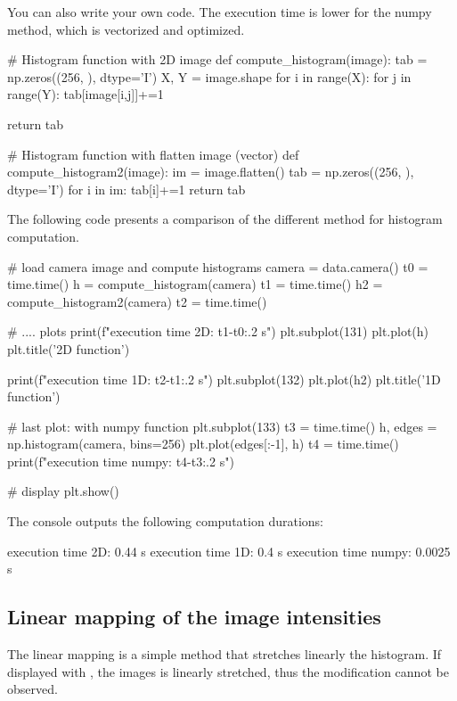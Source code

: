 You can also write your own code. The execution time is lower for the numpy method, which is vectorized and optimized.
\begin{python}
# Histogram function with 2D image
def compute_histogram(image):
    tab = np.zeros((256, ), dtype='I')
    X, Y = image.shape
    for i in range(X):
        for j in range(Y):
            tab[image[i,j]]+=1

    return tab
\end{python}
    
\begin{python}
# Histogram function with flatten image (vector)
def compute_histogram2(image):
    im = image.flatten() 
    tab = np.zeros((256, ), dtype='I')
    for i in im:
        tab[i]+=1
    return tab
\end{python}

The following code presents a comparison of the different method for histogram computation.

\begin{python}
# load camera image and compute histograms
camera = data.camera()
t0 = time.time()
h = compute_histogram(camera)
t1 = time.time()
h2 = compute_histogram2(camera)
t2 = time.time()

# .... plots
print(f"execution time 2D: {t1-t0:.2} s")
plt.subplot(131)
plt.plot(h)
plt.title('2D function')

print(f"execution time 1D: {t2-t1:.2} s")
plt.subplot(132)
plt.plot(h2)
plt.title('1D function')

# last plot: with numpy function
plt.subplot(133)
t3 = time.time()
h, edges = np.histogram(camera, bins=256)
plt.plot(edges[:-1], h)
t4 = time.time()
print(f"execution time numpy: {t4-t3:.2} s")

# display
plt.show()
\end{python}
The console outputs the following computation durations:
\begin{sh}
execution time 2D: 0.44 s
execution time 1D: 0.4 s
execution time numpy: 0.0025 s
\end{sh}


\subsection{Linear mapping of the image intensities}
The linear mapping is a simple method that stretches linearly the histogram. If displayed with , the images is linearly stretched, thus the modification cannot be observed.

